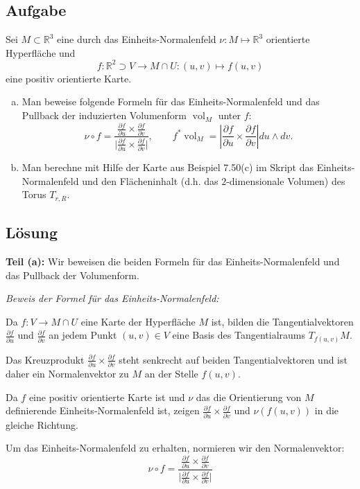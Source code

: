 \documentclass{article}
\DeclareMathOperator{\vol}{vol}
\newcommand{\R}{\mathbb{R}}
\newcommand{\del}{\partial}
\begin{document}
\subsection*{Aufgabe}
Sei $M \subset \R^3$ eine durch das Einheits-Normalenfeld $\nu \colon M \mapsto \R^3$ orientierte Hyperfläche und
$$
f \colon \R^2 \supset V \to M\cap U \colon (u,v) \mapsto f(u,v)
$$
eine positiv orientierte Karte. 
\begin{enumerate}[(a)]
	\item Man beweise folgende Formeln für das Einheits-Normalenfeld und das Pullback der induzierten Volumenform $\vol_M$ unter $f$: 
	$$
	\nu \circ f = \frac{\frac{\del f}{\del u}\times\frac{\del f}{\del v}}{\bigl|\frac{\del f}{\del u}\times\frac{\del f}{\del v}\bigr|}, \qquad
	f^* \vol_M = \left| \frac{\del f}{\del u}\times\frac{\del f}{\del v} \right| du \wedge dv. 
	$$
	\item Man berechne mit Hilfe der Karte aus Beispiel 7.50(c) im Skript das Einheits-Normalenfeld und den Flächeninhalt (d.h. das $2$-dimensionale Volumen) des Torus $T_{r,R}$. 
\end{enumerate}

\subsection*{Lösung}

\textbf{Teil (a):} Wir beweisen die beiden Formeln für das Einheits-Normalenfeld und das Pullback der Volumenform.

\textit{Beweis der Formel für das Einheits-Normalenfeld:}

Da $f: V \to M \cap U$ eine Karte der Hyperfläche $M$ ist, bilden die Tangentialvektoren $\frac{\del f}{\del u}$ und $\frac{\del f}{\del v}$ an jedem Punkt $(u,v) \in V$ eine Basis des Tangentialraums $T_{f(u,v)}M$. 

Das Kreuzprodukt $\frac{\del f}{\del u} \times \frac{\del f}{\del v}$ steht senkrecht auf beiden Tangentialvektoren und ist daher ein Normalenvektor zu $M$ an der Stelle $f(u,v)$.

Da $f$ eine positiv orientierte Karte ist und $\nu$ das die Orientierung von $M$ definierende Einheits-Normalenfeld ist, zeigen $\frac{\del f}{\del u} \times \frac{\del f}{\del v}$ und $\nu(f(u,v))$ in die gleiche Richtung. 

Um das Einheits-Normalenfeld zu erhalten, normieren wir den Normalenvektor:
$$\nu \circ f = \frac{\frac{\del f}{\del u}\times\frac{\del f}{\del v}}{\bigl|\frac{\del f}{\del u}\times\frac{\del f}{\del v}\bigr|}$$
\end{document}
